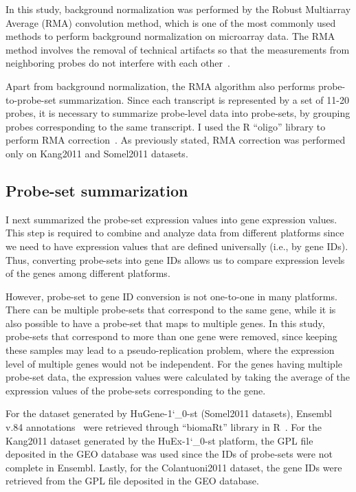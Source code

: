 In this study, background normalization was performed by the Robust Multiarray Average (RMA) convolution method, 
which is one of the most commonly used methods to perform background normalization on microarray data. 
The RMA method involves the removal of technical artifacts so that the measurements from neighboring probes do not interfere with each other~\autocite{Irizarry2003}.

Apart from background normalization, the RMA algorithm also performs probe-to-probe-set summarization. 
Since each transcript is represented by a set of 11-20 probes, it is necessary to summarize probe-level data into probe-sets, 
by grouping probes corresponding to the same transcript. I used the R ``oligo'' library to perform RMA correction~\autocite{Carvalho2010}.
As previously stated, RMA correction was performed only on Kang2011 and Somel2011 datasets.

\subsection{Probe-set summarization}
I next summarized the probe-set expression values into gene expression values. 
This step is required to combine and analyze data from different platforms since we need to have expression values that are defined universally (i.e., by gene IDs).
Thus, converting probe-sets into gene IDs allows us to compare expression levels of the genes among different platforms.

However, probe-set to gene ID conversion is not one-to-one in many platforms. 
There can be multiple probe-sets that correspond to the same gene, while it is also possible to have a probe-set that maps to multiple genes. 
In this study, probe-sets that correspond to more than one gene were removed, since keeping these samples may lead to a pseudo-replication problem, 
where the expression level of multiple genes would not be independent. 
For the genes having multiple probe-set data, the expression values were calculated by taking the average of the expression values of the probe-sets corresponding to the gene.

For the dataset generated by HuGene-1\char`_0-st (Somel2011 datasets), 
Ensembl v.84 annotations~\autocite{Yates2016} were retrieved through ``biomaRt'' library in R~\autocite{Durinck2009}.
For the Kang2011 dataset generated by the HuEx-1\char`_0-st platform, the GPL file deposited in the GEO database was used since the IDs of probe-sets were not complete in Ensembl.
Lastly, for the Colantuoni2011 dataset, the gene IDs were retrieved from the GPL file deposited in the GEO database.

